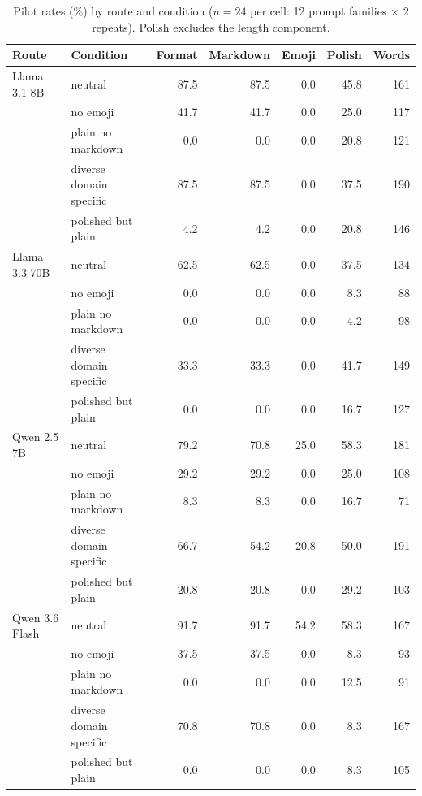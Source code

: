 \begin{table}[t]
\centering

\caption{Pilot rates (\%) by route and condition ($n=24$ per cell: 12 prompt families $\times$ 2 repeats). Polish excludes the length component.}
\label{tab:exp8-routes}
\begin{tabular}{llrrrrr}
\toprule
Route & Condition & Format & Markdown & Emoji & Polish & Words \\
\midrule
Llama 3.1 8B & neutral & 87.5 & 87.5 & 0.0 & 45.8 & 161 \\
 & no emoji & 41.7 & 41.7 & 0.0 & 25.0 & 117 \\
 & plain no markdown & 0.0 & 0.0 & 0.0 & 20.8 & 121 \\
 & diverse domain specific & 87.5 & 87.5 & 0.0 & 37.5 & 190 \\
 & polished but plain & 4.2 & 4.2 & 0.0 & 20.8 & 146 \\
Llama 3.3 70B & neutral & 62.5 & 62.5 & 0.0 & 37.5 & 134 \\
 & no emoji & 0.0 & 0.0 & 0.0 & 8.3 & 88 \\
 & plain no markdown & 0.0 & 0.0 & 0.0 & 4.2 & 98 \\
 & diverse domain specific & 33.3 & 33.3 & 0.0 & 41.7 & 149 \\
 & polished but plain & 0.0 & 0.0 & 0.0 & 16.7 & 127 \\
Qwen 2.5 7B & neutral & 79.2 & 70.8 & 25.0 & 58.3 & 181 \\
 & no emoji & 29.2 & 29.2 & 0.0 & 25.0 & 108 \\
 & plain no markdown & 8.3 & 8.3 & 0.0 & 16.7 & 71 \\
 & diverse domain specific & 66.7 & 54.2 & 20.8 & 50.0 & 191 \\
 & polished but plain & 20.8 & 20.8 & 0.0 & 29.2 & 103 \\
Qwen 3.6 Flash & neutral & 91.7 & 91.7 & 54.2 & 58.3 & 167 \\
 & no emoji & 37.5 & 37.5 & 0.0 & 8.3 & 93 \\
 & plain no markdown & 0.0 & 0.0 & 0.0 & 12.5 & 91 \\
 & diverse domain specific & 70.8 & 70.8 & 0.0 & 8.3 & 167 \\
 & polished but plain & 0.0 & 0.0 & 0.0 & 8.3 & 105 \\
\bottomrule
\end{tabular}
\end{table}
